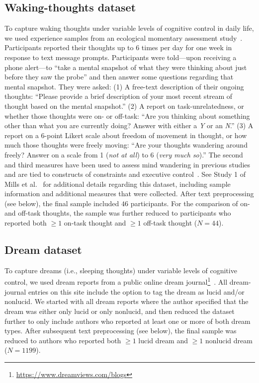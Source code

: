 \documentclass[10pt,a4paper,twocolumn]{article}
\begin{document}
\subsection*{Waking-thoughts dataset}
To capture waking thoughts under variable levels of cognitive control in daily life, we used experience samples from an ecological momentary assessment study~\cite{mills2021}. Participants reported their thoughts up to 6 times per day for one week in response to text message prompts. Participants were told---upon receiving a phone alert---to ``take a mental snapshot of what they were thinking about just before they saw the probe'' and then answer some questions regarding that mental snapshot. They were asked: (1) A free-text description of their ongoing thoughts: ``Please provide a brief description of your most recent stream of thought based on the mental snapshot.'' (2) A report on task-unrelatedness, or whether those thoughts were on- or off-task: ``Are you thinking about something other than what you are currently doing? Answer with either a \textit{Y} or an \textit{N}.'' (3) A report on a 6-point Likert scale about freedom of movement in thought, or how much those thoughts were freely moving: ``Are your thoughts wandering around freely? Answer on a scale from 1 (\textit{not at all}) to 6 (\textit{very much so}).'' The second and third measures have been used to assess mind wandering in previous studies and are tied to constructs of constraints and executive control~\cite{mills2018a}. See Study 1 of Mills et al.~\cite{mills2021} for additional details regarding this dataset, including sample information and additional measures that were collected. After text preprocessing (see below), the final sample included $46$ participants. For the comparison of on- and off-task thoughts, the sample was further reduced to participants who reported both $\ge 1$ on-task thought and $\ge 1$ off-task thought ($\mathit{N}=44$).

\subsection*{Dream dataset}
To capture dreams (i.e., sleeping thoughts) under variable levels of cognitive control, we used dream reports from a public online dream journal\footnote{\url{https://www.dreamviews.com/blogs}}~\cite{schredl2022}. All dream-journal entries on this site include the option to tag the dream as lucid and/or nonlucid. We started with all dream reports where the author specified that the dream was either only lucid or only nonlucid, and then reduced the dataset further to only include authors who reported at least one or more of both dream types. After subsequent text preprocessing (see below), the final sample was reduced to authors who reported both $\ge 1$ lucid dream and $\ge 1$ nonlucid dream ($\mathit{N}=1199$).
\end{document}
